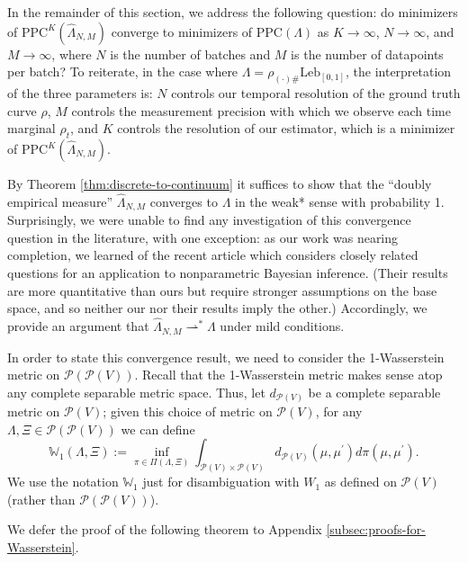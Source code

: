 \documentclass[aos, preprint]{imsart}
\theoremstyle{plain}
\theoremstyle{remark}
\begin{document}
{In the remainder of this section, we address the following question:
do minimizers of $\text{PPC}^{K}(\hat{\Lambda}_{N,M})$ converge to
minimizers of $\text{PPC}(\Lambda)$ as $K\rightarrow\infty$, $N\rightarrow\infty$,
and $M\rightarrow\infty$, where $N$ is the number of batches and
$M$ is the number of datapoints per batch? To reiterate, in the case where $\Lambda=\rho_{(\cdot)\#}\textrm{Leb}_{[0,1]}$, the interpretation of the three parameters is: $N$ controls our temporal resolution of the ground truth curve $\rho$, $M$ controls the measurement precision with which we observe each time marginal $\rho_t$, and $K$ controls the resolution of our estimator, which is a minimizer of $\text{PPC}^{K}(\hat{\Lambda}_{N,M})$.

By Theorem \ref{thm:discrete-to-continuum} it suffices to show that
the ``doubly empirical measure'' $\hat{\Lambda}_{N,M}$ converges
to $\Lambda$ in the weak{*} sense with probability 1. Surprisingly,
we were unable to find any investigation of this convergence question
in the literature, with one exception: as our work was nearing completion, we learned of the recent article \cite{catalano2024hierarchical} which considers closely related questions for an application to nonparametric Bayesian inference. (Their results are more quantitative than ours but require stronger assumptions on the base space, and so neither our nor their results imply the other.) Accordingly, we provide an argument that $\hat{\Lambda}_{N,M}\rightharpoonup^{*}\Lambda$
under mild conditions.

In order to state this convergence result, we need to consider the
1-Wasserstein metric on $\mathcal{P}(\mathcal{P}(V))$. Recall that
the 1-Wasserstein metric makes sense atop any complete separable metric
space. Thus, let $d_{\mathcal{P}(V)}$ be a complete separable metric
on $\mathcal{P}(V)$; given this choice of metric on $\mathcal{P}(V)$,
for any $\Lambda,\Xi\in\mathcal{P}(\mathcal{P}(V))$ we can define
\[
\mathbb{W}_{1}(\Lambda,\Xi):=\inf_{\pi\in\Pi(\Lambda,\Xi)}\int_{\mathcal{P}(V)\times\mathcal{P}(V)}d_{\mathcal{P}(V)}(\mu,\mu^{\prime})d\pi(\mu,\mu^{\prime}).
\]
We use the notation $\mathbb{W}_{1}$ just for disambiguation with
$W_{1}$ as defined on $\mathcal{P}(V)$ (rather than $\mathcal{P}(\mathcal{P}(V))$).


We defer the proof of the following theorem to Appendix \ref{subsec:proofs-for-Wasserstein}.

}
\end{document}

